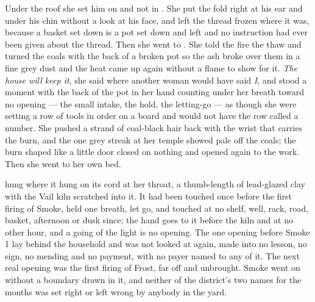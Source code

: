 Under the roof she set him on  and not in . She put the fold right at his ear and under his chin without a look at his face, and left the thread frozen where it was, because a basket set down is a pot set down and left and no instruction had ever been given about the thread. Then she went to . She told the fire the thaw and turned the coals with the back of a broken pot so the ash broke over them in a fine grey dust and the heat came up again without a flame to show for it. \emph{The house will keep it}, she said where another woman would have said \emph{I}, and stood a moment with the back of the pot in her hand counting under her breath toward no opening --- the small intake, the hold, the letting-go --- as though she were setting a row of tools in order on a board and would not have the row called a number. She pushed a strand of coal-black hair back with the wrist that carries the burn, and the one grey streak at her temple showed pale off the coals; the burn shaped like a little door closed on nothing and opened again to the work. Then she went to her own bed.

 hung where it hung on its cord at her throat, a thumb-length of lead-glazed clay with the Vail kiln scratched into it. It had been touched once before the first firing of Smoke, held one breath, let go, and touched at no shelf, well, rack, road, basket, afternoon or dusk since; the hand goes to it before the kiln and at no other hour, and a going of the light is no opening. The one opening before Smoke 1 lay behind the household and was not looked at again, made into no lesson, no sign, no mending and no payment, with no payer named to any of it. The next real opening was the first firing of Frost, far off and unbrought. Smoke went on without a boundary drawn in it, and neither of the district's two names for the months was set right or left wrong by anybody in the yard.

\scenebreak

